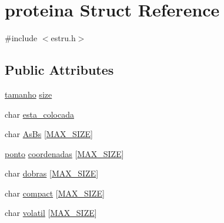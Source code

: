 \hypertarget{structproteina}{\section{proteina Struct Reference}
\label{structproteina}
}


{\ttfamily \#include $<$estru.\-h$>$}

\subsection*{Public Attributes}
\begin{DoxyCompactItemize}
\item 
\hyperlink{structtamanho}{tamanho} \hyperlink{structproteina_a62d004265c69e8eb9abf29bfb77bf2f3}{size}
\item 
char \hyperlink{structproteina_aa798eeae3896b51328073cc34880cdcd}{esta\-\_\-colocada}
\item 
char \hyperlink{structproteina_a9ea7689fbbef51b52b26da34bd2b8ddb}{As\-Bs} \mbox{[}\hyperlink{estru_8h_a0592dba56693fad79136250c11e5a7fe}{M\-A\-X\-\_\-\-S\-I\-Z\-E}\mbox{]}
\item 
\hyperlink{structponto}{ponto} \hyperlink{structproteina_a0379de907b6d76a996b59e7200140445}{coordenadas} \mbox{[}\hyperlink{estru_8h_a0592dba56693fad79136250c11e5a7fe}{M\-A\-X\-\_\-\-S\-I\-Z\-E}\mbox{]}
\item 
char \hyperlink{structproteina_a9f2426a372510367a6e9609c141db95c}{dobras} \mbox{[}\hyperlink{estru_8h_a0592dba56693fad79136250c11e5a7fe}{M\-A\-X\-\_\-\-S\-I\-Z\-E}\mbox{]}
\item 
char \hyperlink{structproteina_ab229e1b19f1bceafc28f7beafb2e3c83}{compact} \mbox{[}\hyperlink{estru_8h_a0592dba56693fad79136250c11e5a7fe}{M\-A\-X\-\_\-\-S\-I\-Z\-E}\mbox{]}
\item 
char \hyperlink{structproteina_af0f779a87545cb00acb4ecdd86e47f5f}{volatil} \mbox{[}\hyperlink{estru_8h_a0592dba56693fad79136250c11e5a7fe}{M\-A\-X\-\_\-\-S\-I\-Z\-E}\mbox{]}
\end{DoxyCompactItemize}


